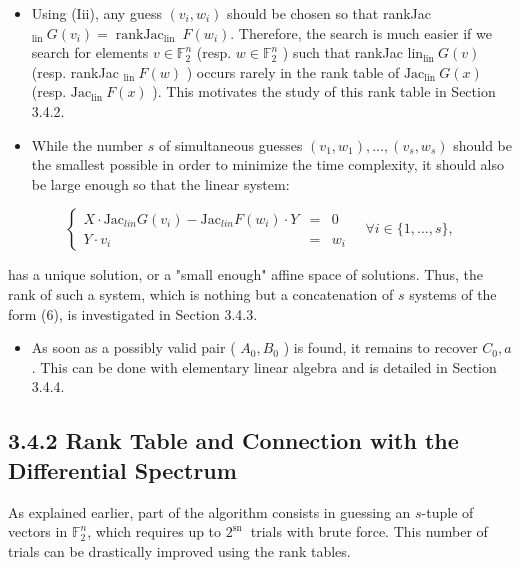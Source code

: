 \documentclass[10pt]{article}
\begin{document}
\begin{itemize}
  \item Using (Iii), any guess $\left(v_{i}, w_{i}\right)$ should be chosen so that rankJac ${ }_{\text {lin }} G\left(v_{i}\right)=\operatorname{rankJac}_{\text {lin }} F\left(w_{i}\right)$. Therefore, the search is much easier if we search for elements $v \in \mathbb{F}_{2}^{n}$ (resp. $w \in \mathbb{F}_{2}^{n}$ ) such that rankJac $\mathrm{lin}_{\text {lin }} G(v)$ (resp. rankJac ${ }_{\text {lin }} F(w)$ ) occurs rarely in the rank table of $\mathrm{Jac}_{\text {lin }} G(x)$ (resp. $\mathrm{Jac}_{\text {lin }} F(x)$ ). This motivates the study of this rank table in Section 3.4.2.
  \item While the number $s$ of simultaneous guesses $\left(v_{1}, w_{1}\right), \ldots,\left(v_{s}, w_{s}\right)$ should be the smallest possible in order to minimize the time complexity, it should also be large enough so that the linear system:
\end{itemize}

\[
\left\{\begin{array}{cll}
X \cdot \mathrm{Jac}_{l i n} G\left(v_{i}\right)-\mathrm{Jac}_{l i n} F\left(w_{i}\right) \cdot Y & = & 0  \tag{7}\\
Y \cdot v_{i} & = & w_{i}
\end{array} \quad \forall i \in\{1, \ldots, s\},\right.
\]

has a unique solution, or a "small enough" affine space of solutions. Thus, the rank of such a system, which is nothing but a concatenation of $s$ systems of the form (6), is investigated in Section 3.4.3.

\begin{itemize}
  \item As soon as a possibly valid pair ( $A_{0}, B_{0}$ ) is found, it remains to recover $C_{0}, a$. This can be done with elementary linear algebra and is detailed in Section 3.4.4.
\end{itemize}

\subsection*{3.4.2 Rank Table and Connection with the Differential Spectrum}
As explained earlier, part of the algorithm consists in guessing an $s$-tuple of vectors in $\mathbb{F}_{2}^{n}$, which requires up to $2^{\text {sn }}$ trials with brute force. This number of trials can be drastically improved using the rank tables.
\end{document}
